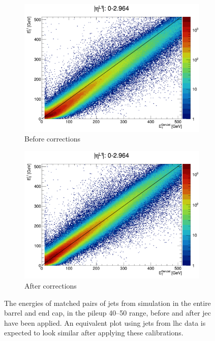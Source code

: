 \begin{figure}[htbp]
    \centering
    \begin{subfigure}[b]{0.45\textwidth}
        \includegraphics[width=\textwidth]{./figures/jecs/scatterPlotBeforeBE.pdf}
        \caption{Before corrections}
        \label{fig:detector_jecs_scatter_before_BE}
    \end{subfigure}
    \hfill
    \begin{subfigure}[b]{0.45\textwidth}
        \includegraphics[width=\textwidth]{./figures/jecs/scatterPlotAfterBE.pdf}
        \caption{After corrections}
        \label{fig:detector_jecs_scatter_after_BE}
    \end{subfigure}
\caption[The energies of matched pairs of jets from simulation in the entire barrel and end cap, in the pileup 40--50 range, before and after jet energy corrections have been applied]{The energies of matched pairs of \glspl{jet} from simulation in the entire barrel and end cap, in the \gls{pileup} 40--50 range, before and after \acrlong{jec} have been applied. An equivalent plot using \glspl{jet} from \acrshort{lhc} data is expected to look similar after applying these calibrations.}
\label{fig:detector_jecs_scatter_BE}
\end{figure}

